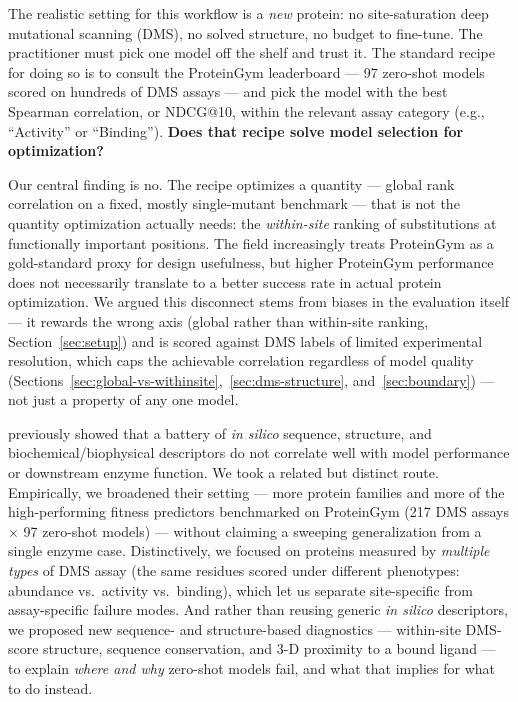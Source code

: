 \documentclass{article}
\begin{document}
The realistic setting for this workflow is a \emph{new} protein: no site-saturation deep mutational scanning (DMS), no solved structure, no budget to fine-tune. The practitioner must pick one model off the shelf and trust it. The standard recipe for doing so is to consult the ProteinGym leaderboard --- 97 zero-shot models scored on hundreds of DMS assays --- and pick the model with the best Spearman correlation, or NDCG@10, within the relevant assay category (e.g., ``Activity'' or ``Binding''). \textbf{Does that recipe solve model selection for optimization?}

Our central finding is no. The recipe optimizes a quantity --- global rank correlation on a fixed, mostly single-mutant benchmark --- that is not the quantity optimization actually needs: the \emph{within-site} ranking of substitutions at functionally important positions. The field increasingly treats ProteinGym as a gold-standard proxy for design usefulness, but higher ProteinGym performance does not necessarily translate to a better success rate in actual protein optimization. We argued this disconnect stems from biases in the evaluation itself --- it rewards the wrong axis (global rather than within-site ranking, Section~\ref{sec:setup}) and is scored against DMS labels of limited experimental resolution, which caps the achievable correlation regardless of model quality (Sections~\ref{sec:global-vs-withinsite},~\ref{sec:dms-structure}, and~\ref{sec:boundary}) --- not just a property of any one model.

\citet{spinner_unified_2026} previously showed that a battery of \emph{in silico} sequence, structure, and biochemical/biophysical descriptors do not correlate well with model performance or downstream enzyme function. We took a related but distinct route. Empirically, we broadened their setting --- more protein families and more of the high-performing fitness predictors benchmarked on ProteinGym (217 DMS assays $\times$ 97 zero-shot models) --- without claiming a sweeping generalization from a single enzyme case. Distinctively, we focused on proteins measured by \emph{multiple types} of DMS assay (the same residues scored under different phenotypes: abundance vs.\ activity vs.\ binding), which let us separate site-specific from assay-specific failure modes. And rather than reusing generic \emph{in silico} descriptors, we proposed new sequence- and structure-based diagnostics --- within-site DMS-score structure, sequence conservation, and 3-D proximity to a bound ligand --- to explain \emph{where and why} zero-shot models fail, and what that implies for what to do instead.
\end{document}
